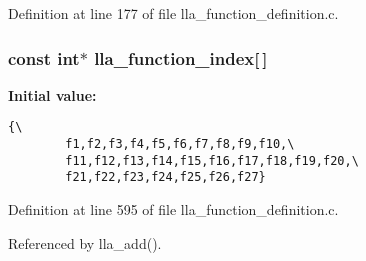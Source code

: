 Definition at line 177 of file lla\_\-function\_\-definition.c.
\subsubsection{\setlength{\rightskip}{0pt plus 5cm}const int$\ast$ {\bf lla\_\-function\_\-index}[$\,$]}\label{lla__function__definition_8c_a27}


{\bf Initial value:}

\footnotesize\begin{verbatim}{\
        f1,f2,f3,f4,f5,f6,f7,f8,f9,f10,\
        f11,f12,f13,f14,f15,f16,f17,f18,f19,f20,\
        f21,f22,f23,f24,f25,f26,f27}
\end{verbatim}\normalsize 


Definition at line 595 of file lla\_\-function\_\-definition.c.

Referenced by lla\_\-add().